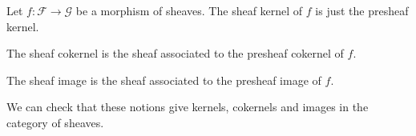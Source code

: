 Let $f\colon \mathcal{F}\to \mathcal{G}$ be a morphism of sheaves. The sheaf kernel of $f$
is just the presheaf kernel.

The sheaf cokernel is the sheaf associated to the presheaf cokernel of $f$.

The sheaf image is the sheaf associated to the presheaf image of $f$.

We can check that these notions give kernels, cokernels and images in the category
of sheaves.
